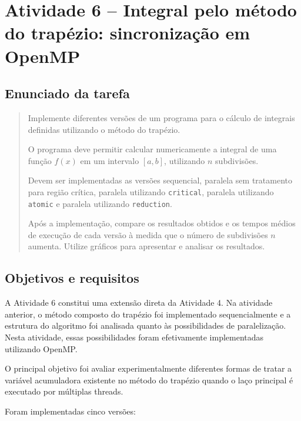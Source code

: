 \chapter{Atividade 6 -- Integral pelo método do trapézio: sincronização em OpenMP}

\label{chap:atvd06}

\section{Enunciado da tarefa}

\label{sec:atvd06-enunciado}

\begin{quote}

Implemente diferentes versões de um programa para o cálculo de integrais
definidas utilizando o método do trapézio.

O programa deve permitir calcular numericamente a integral de uma função
\(f(x)\) em um intervalo \([a,b]\), utilizando \(n\) subdivisões.

Devem ser implementadas as versões sequencial, paralela sem tratamento para
região crítica, paralela utilizando \texttt{critical}, paralela utilizando
\texttt{atomic} e paralela utilizando \texttt{reduction}.

Após a implementação, compare os resultados obtidos e os tempos médios de
execução de cada versão à medida que o número de subdivisões \(n\) aumenta.
Utilize gráficos para apresentar e analisar os resultados.

\end{quote}


\section{Objetivos e requisitos}

\label{sec:atvd06-objetivos}

A Atividade 6 constitui uma extensão direta da Atividade 4. Na atividade
anterior, o método composto do trapézio foi implementado sequencialmente e
a estrutura do algoritmo foi analisada quanto às possibilidades de
paralelização. Nesta atividade, essas possibilidades foram efetivamente
implementadas utilizando OpenMP.

O principal objetivo foi avaliar experimentalmente diferentes formas de
tratar a variável acumuladora existente no método do trapézio quando o
laço principal é executado por múltiplas threads.

Foram implementadas cinco versões:


